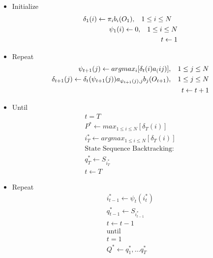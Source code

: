 \documentclass[12pt]{report}
\begin{document}
\begin{itemize}
	\item Initialize
	\begin{equation}
	\begin{split}
	\delta_1 (i) \leftarrow \pi_ib_i(O_1), \hspace{3 mm} 1 \leq i \leq N \hspace{3 mm} \\
	\psi_1 (i) \leftarrow 0, \hspace{3 mm} 1 \leq i \leq N \\
	t \leftarrow 1
	\end{split}
	\end{equation} 
	\item Repeat
	\begin{equation}
	\begin{split}
	\psi_{t+1}(j) \leftarrow argmax_i[\delta_t(i)a_(ij)], \hspace{3 mm} 1 \leq j \leq N \\
	\delta_{t+1}(j) \leftarrow \delta_t(\psi_{t+1}(j))a_{\psi_{t+1}(j),j}b_j(O_{t+1}), \hspace{3 mm} 1 \leq j \leq N \\
	t \leftarrow t + 1
	\end{split}
	\end{equation}
	\item Until
	\begin{equation}
	\begin{split}
	t = T \\
	P^* \leftarrow max_{1 \leq i \leq N}[\delta_T(i)] \\
	i_T^* \leftarrow argmax_{1 \leq i \leq N}[\delta_T(i)] \\
	\text{State Sequence Backtracking:} \\
	q_T^* \leftarrow S_{i_T^*} \\
	t \leftarrow T
	\end{split}
	\end{equation}
	\item Repeat
	\begin{equation}
	\begin{split}
	i_{t-1}^* \leftarrow \psi_t(i_t^*) \\
	q_{t-1}^* \leftarrow S_{i_{t-1}^*} \\
	t \leftarrow t - 1 \\
	\text{until} \\
	t = 1 \\
	Q^* \leftarrow q_1^*,...q_T^*
	\end{split}
	\end{equation}
\end{itemize}
\end{document}
